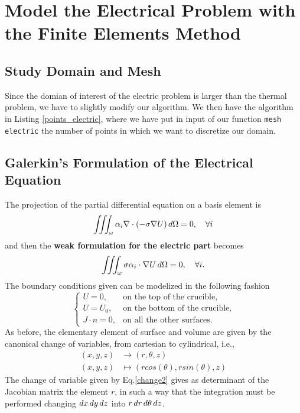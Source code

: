 \section{Model the Electrical Problem with the Finite Elements Method}
\subsection{Study Domain and Mesh}
Since the domian of interest of the electric problem is larger than the thermal problem, we have to slightly modify our algorithm. We then have the algorithm in Listing \ref{points_electric}, where we have put in input of our function \texttt{mesh electric} the number of points in which we want to discretize our domain.






\subsection{Galerkin’s Formulation of the Electrical Equation}
The projection of the partial differential equation on a basis element is
\[\iiint_{\omega} \alpha_i \nabla\cdot(-\sigma\nabla U)\mathop{}\!d\Omega=0, \quad \forall i \]
and then the \textbf{weak formulation for the electric part} becomes
\begin{equation}
\iiint_{\omega}\sigma\alpha_i\cdot\nabla U\mathop{}\!d \Omega=0,\quad \forall i.
\end{equation}
The boundary conditions given can be modelized in the following fashion
\[\begin{cases}
U = 0, &\text{on the top of the crucible,}\\
U = U_0, &\text{on the bottom of the crucible,}\\
J\cdot n=0, &\text{on all the other surfaces.}
\end{cases} \]
As before, the elementary element of surface and volume are given by the canonical change of variables, from cartesian to cylindrical, i.e., \begin{align}\label{change2}
(x,y,z)&\to(r,\theta,z)\\
(x,y,z)&\mapsto(rcos(\theta),rsin(\theta),z)\nonumber
\end{align}
The change of variable given by Eq.\ref{change2} gives as determinant of the Jacobian matrix the element $ r $, in such a way that the integration must be performed changing $ \mathop{}\!d x\mathop{}\!d y\mathop{}\!d z $ into $ r\mathop{}\!d r\mathop{}\!d\theta\mathop{}\!d z $.

